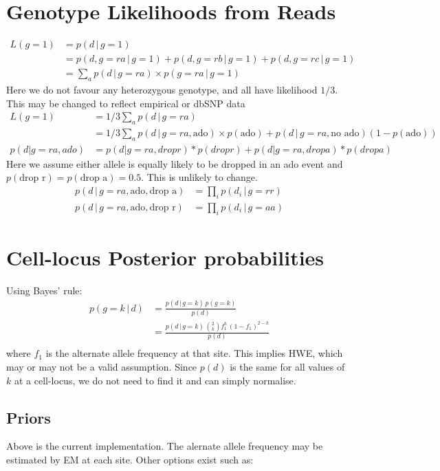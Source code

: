 \documentclass{article}
\begin{document}
\section{Genotype Likelihoods from Reads}
\begin{align*}
L(g=1) &= p(d\,|\,g=1)\\
&=p(d, g=ra \,|\, g=1) + p(d, g=rb \,|\, g=1) + p(d, g=rc \,|\, g=1)\\
&= \sum_a p(d \,|\, g=ra) \times p(g=ra \,|\, g=1)
\end{align*}
Here we do not favour any heterozygous genotype, and all have likelihood $1/3$. This may be changed to reflect empirical or dbSNP data
\begin{align*}
L(g=1) &= 1/3 \sum_a p(d \,|\, g=ra)\\
&= 1/3 \sum_a p(d \,|\, g=ra, \text{ado}) \times p(\text{ado}) + p(d \,|\, g=ra, \text{no ado})(1-p(\text{ado}))\\
p(d|g=ra, ado) &= p(d|g=ra, drop r) * p(drop r) + p(d|g=ra, drop a) * p(drop a)
\end{align*}
Here we assume either allele is equally likely to be dropped in an ado event and $p(\text{drop r}) = p(\text{drop a}) = 0.5$. This is unlikely to change.
\begin{align*}
p(d \,|\, g=ra, \text{ado}, \text{drop a}) &= \prod_i p(d_i \,|\, g=rr)\\
p(d \,|\, g=ra, \text{ado}, \text{drop r}) &= \prod_i p(d_i \,|\, g=aa)
\end{align*}

\section{Cell-locus Posterior probabilities}
Using Bayes' rule:
\begin{align*}
p(g=k\,|\, d) &= \frac{p(d\,|\,g=k)\,p(g=k)}{p(d)}\\
&= \frac{p(d\,|\,g=k)\,\binom{2}{k}f_1^k\,(1-f_1)^{2-k}}{p(d)}\\
\end{align*}
where $f_1$ is the alternate allele frequency at that site. This implies HWE, which may or may not be a valid assumption. Since $p(d)$ is the same for all values of $k$ at a cell-locus, we do not need to find it and can simply normalise.
\subsection{Priors}
Above is the current implementation. The alernate allele frequency may be estimated by EM at each site. Other options exist such as:
\end{document}
